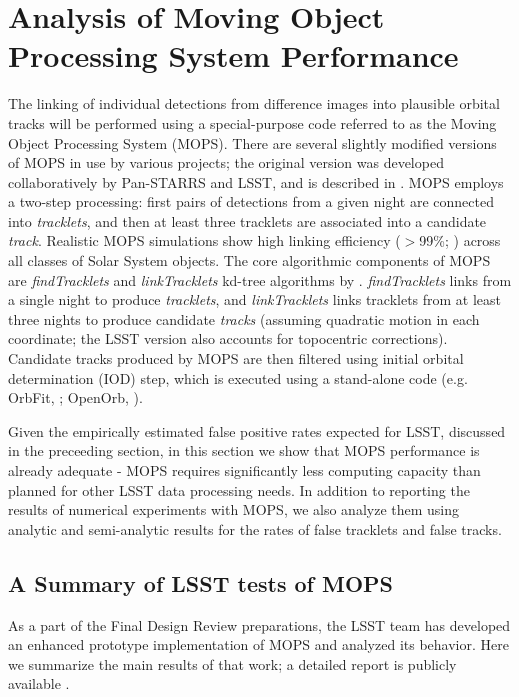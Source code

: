 
\section{Analysis of Moving Object Processing System Performance \label{sec:mops}}


The linking of individual detections from difference images into plausible orbital tracks will be performed using
a special-purpose code referred to as the Moving Object Processing System (MOPS). There are several slightly modified
versions of MOPS in use by various projects; the original version was developed collaboratively by Pan-STARRS
and LSST, and is described in \cite{denneau13}. MOPS employs a two-step processing: first pairs of detections
from a given night are connected into {\it tracklets}, and then at least three tracklets are associated into a
candidate {\it track}. Realistic MOPS simulations show high linking efficiency ($>$99\%; \citealt{denneau13})
across all classes of Solar System objects. The core algorithmic components of MOPS are {\it findTracklets} and
{\it linkTracklets} kd-tree algorithms by \citet{kubica07}. {\it findTracklets} links \DIASources from a single
night to produce {\it tracklets}, and {\it linkTracklets} links tracklets from at least three nights to produce candidate
{\it tracks} (assuming quadratic motion in each coordinate; the LSST version also accounts for topocentric
corrections). Candidate tracks produced by MOPS are then filtered using initial orbital determination (IOD) step,
which is executed using a stand-alone code (e.g. OrbFit, \citealt{milani08}; OpenOrb, \citealt{OpenOrb2009}).

Given the empirically estimated false positive rates expected for LSST, discussed in the preceeding section,
in this section we show that MOPS performance is already adequate - MOPS requires significantly less
computing capacity than planned for other LSST data processing needs. In addition to reporting the results of
numerical experiments with MOPS, we also analyze them using analytic and semi-analytic results for the
rates of false tracklets and false tracks.




\subsection{A Summary of LSST tests of MOPS}

As a part of the Final Design Review preparations, the LSST team has developed an enhanced prototype
implementation of MOPS and analyzed its behavior. Here we summarize the main results of that work;
a detailed report is publicly available \citep{LDM-156}.

